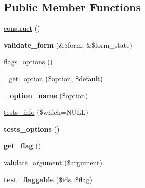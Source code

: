 \subsection*{Public Member Functions}
\begin{CompactItemize}
\item 
\hyperlink{classflag__plugin__argument__validate__flaggability_6eb16f6ded91625eb61ea1af4ac22e9d}{construct} ()
\item 
\hypertarget{classflag__plugin__argument__validate__flaggability_0d57b4aef86d9c014c58c491f3869612}{
\textbf{validate\_\-form} (\&\$form, \&\$form\_\-state)}
\label{classflag__plugin__argument__validate__flaggability_0d57b4aef86d9c014c58c491f3869612}

\item 
\hyperlink{classflag__plugin__argument__validate__flaggability_4c3bce43163725971479413be31a1c0c}{flags\_\-options} ()
\item 
\hyperlink{classflag__plugin__argument__validate__flaggability_add59b32c44ce29fd772d80641087e21}{\_\-get\_\-option} (\$option, \$default)
\item 
\hypertarget{classflag__plugin__argument__validate__flaggability_01bdfefc91191953b5a6bbadd488aec5}{
\textbf{\_\-option\_\-name} (\$option)}
\label{classflag__plugin__argument__validate__flaggability_01bdfefc91191953b5a6bbadd488aec5}

\item 
\hyperlink{classflag__plugin__argument__validate__flaggability_2ec92ee4546bfb70b7d81b183a6236c5}{tests\_\-info} (\$which=NULL)
\item 
\hypertarget{classflag__plugin__argument__validate__flaggability_a7076d2e4ba2d8e3f845fa2a9d54474f}{
\textbf{tests\_\-options} ()}
\label{classflag__plugin__argument__validate__flaggability_a7076d2e4ba2d8e3f845fa2a9d54474f}

\item 
\hypertarget{classflag__plugin__argument__validate__flaggability_9b3e97ae8e2e4162e809cac22b08d8f3}{
\textbf{get\_\-flag} ()}
\label{classflag__plugin__argument__validate__flaggability_9b3e97ae8e2e4162e809cac22b08d8f3}

\item 
\hyperlink{classflag__plugin__argument__validate__flaggability_7a0ea8ffaee8f3d6d32956ce68dbd458}{validate\_\-argument} (\$argument)
\item 
\hypertarget{classflag__plugin__argument__validate__flaggability_bb52aceb7819d06e78a3ae8e5a199176}{
\textbf{test\_\-flaggable} (\$ids, \$flag)}
\label{classflag__plugin__argument__validate__flaggability_bb52aceb7819d06e78a3ae8e5a199176}


\end{CompactItemize}

